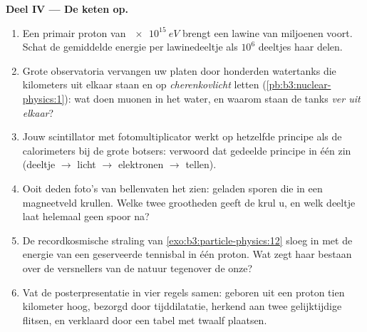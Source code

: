 \begin{problem}
\medskip\noindent\textbf{Deel IV --- De keten op.}

\begin{enumerate}[resume]
  \item Een primair proton van $\qty{e15}{eV}$ brengt een lawine van
        miljoenen voort. Schat de gemiddelde energie per lawinedeeltje
        als $10^{6}$ deeltjes haar delen.
  \item Grote observatoria vervangen uw platen door honderden
        watertanks die kilometers uit elkaar staan en op
        \emph{cherenkovlicht} letten (\cref{pb:b3:nuclear-physics:1}):
        wat doen muonen in het water, en waarom staan de tanks \emph{ver
        uit elkaar}?
  \item Jouw scintillator met fotomultiplicator werkt op hetzelfde
        principe als de calorimeters bij de grote botsers:
        verwoord dat gedeelde principe in één zin
        (deeltje $\to$ licht $\to$ elektronen $\to$ tellen).
  \item Ooit deden foto's van bellenvaten het zien: geladen
        sporen die in een magneetveld krullen. Welke twee grootheden
        geeft de krul u, en welk deeltje laat helemaal geen spoor na?
  \item De recordkosmische straling van
        \cref{exo:b3:particle-physics:12} sloeg in met de energie van
        een geserveerde tennisbal in één proton. Wat zegt haar
        bestaan over de versnellers van de natuur tegenover de onze?
  \item Vat de posterpresentatie in vier regels samen: geboren uit een
        proton tien kilometer hoog, bezorgd door tijddilatatie,
        herkend aan twee gelijktijdige flitsen, en verklaard door een
        tabel met twaalf plaatsen.
\end{enumerate}
\end{problem}

